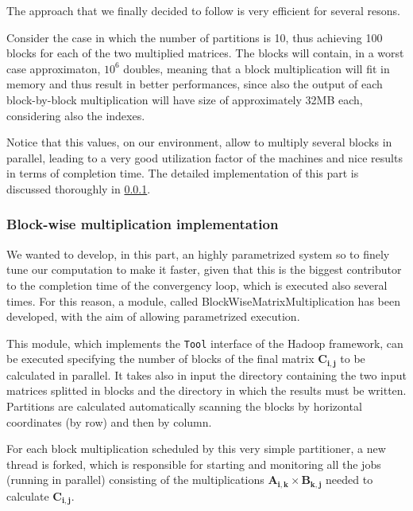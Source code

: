 The approach that we finally decided to follow is very efficient for several resons.

Consider the case in which the number of partitions is 10, thus achieving 100 blocks for each of the two multiplied matrices.
The blocks will contain, in a worst case approximaton, $10^6$ doubles, meaning that a block multiplication will fit in memory and thus result in better performances, since also the output of each block-by-block multiplication will have size of approximately 32MB each, considering also the indexes.

Notice that this values, on our environment, allow to multiply several blocks in parallel, leading to a very good utilization
factor of the machines and nice results in terms of completion time.
The detailed implementation of this part is discussed thoroughly in \ref{blockmul}.

\subsubsection{Block-wise multiplication implementation}
\label{blockmul}
We wanted to develop, in this part, an highly parametrized system so to finely tune our computation to make it faster,
given that this is the biggest contributor to the completion time of the convergency loop, which is executed also several times.
For this reason, a module, called BlockWiseMatrixMultiplication has been developed, with the aim of allowing parametrized execution.

This module, which implements the \texttt{Tool} interface of the Hadoop framework, can be executed specifying the number
of blocks of the final matrix $\mathbf{C_{i,j}}$ to be calculated in parallel. It takes also in input the directory containing
the two input matrices splitted in blocks and the directory in which the results must be written. 
Partitions are calculated automatically scanning the blocks by horizontal coordinates (by row) and then by column.

For each block multiplication scheduled by this very simple partitioner, a new thread is forked, which is responsible
for starting and monitoring all the jobs (running in parallel) consisting of the multiplications $\mathbf{A_{i,k}} \times \mathbf{B_{k,j}}$ needed to calculate $\mathbf{C_{i,j}}$.

